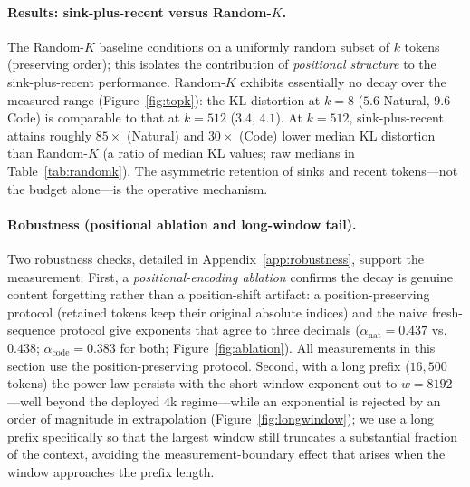 \documentclass[11pt]{article}
\theoremstyle{plain}
\theoremstyle{definition}
\theoremstyle{remark}
\begin{document}
\paragraph{Results: sink-plus-recent versus Random-$K$.}
The Random-$K$ baseline conditions on a uniformly random subset of
$k$ tokens (preserving order); this isolates the contribution of
\emph{positional structure} to the sink-plus-recent performance.
Random-$K$ exhibits essentially
no decay over the measured range (Figure~\ref{fig:topk}): the KL distortion at $k = 8$
($5.6$ Natural, $9.6$ Code) is comparable to that at $k = 512$
($3.4$, $4.1$). At $k = 512$, sink-plus-recent attains roughly
$85\times$ (Natural) and $30\times$ (Code) lower median KL distortion
than Random-$K$ (a ratio of median KL values; raw medians in
Table~\ref{tab:randomk}). The asymmetric retention of sinks and
recent tokens---not the budget alone---is the operative mechanism.

\paragraph{Robustness (positional ablation and long-window tail).}
Two robustness checks, detailed in
Appendix~\ref{app:robustness}, support the measurement. First, a
\emph{positional-encoding ablation} confirms the decay is genuine
content forgetting rather than a position-shift artifact: a
position-preserving protocol (retained tokens keep their original
absolute indices) and the naive fresh-sequence protocol give
exponents that agree to three decimals
($\alpha_{\text{nat}} = 0.437$ vs.\ $0.438$;
$\alpha_{\text{code}} = 0.383$ for both;
Figure~\ref{fig:ablation}). All measurements in this section use the
position-preserving protocol. Second, with a long prefix
($16{,}500$ tokens) the power law persists with the short-window
exponent out to $w = 8192$---well beyond the deployed $4$k
regime---while an exponential is rejected by an order of magnitude in
extrapolation (Figure~\ref{fig:longwindow}); we use a long prefix
specifically so that the largest window still truncates a substantial
fraction of the context, avoiding the measurement-boundary effect
that arises when the window approaches the prefix length.
\end{document}
